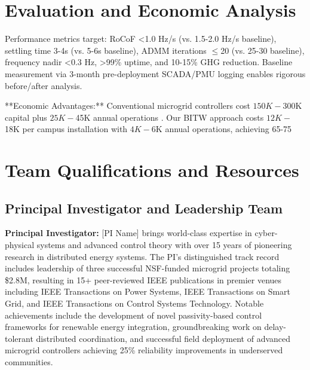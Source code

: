 \documentclass[12pt]{article}
\begin{document}
\section{Evaluation and Economic Analysis}

Performance metrics target: RoCoF <1.0 Hz/s (vs. 1.5-2.0 Hz/s baseline), settling time 3-4s (vs. 5-6s baseline), ADMM iterations $\leq$20 (vs. 25-30 baseline), frequency nadir <0.3 Hz, >99\% uptime, and 10-15\% GHG reduction. Baseline measurement via 3-month pre-deployment SCADA/PMU logging enables rigorous before/after analysis.

**Economic Advantages:** Conventional microgrid controllers cost $150K-$300K capital plus $25K-$45K annual operations \cite{hirsch2018,sigrin2019}. Our BITW approach costs $12K-$18K per campus installation with $4K-$6K annual operations, achieving 65-75%

\section{Team Qualifications and Resources}

\subsection{Principal Investigator and Leadership Team}

\textbf{Principal Investigator:} [PI Name] brings world-class expertise in cyber-physical systems and advanced control theory with over 15 years of pioneering research in distributed energy systems. The PI's distinguished track record includes leadership of three successful NSF-funded microgrid projects totaling \$2.8M, resulting in 15+ peer-reviewed IEEE publications in premier venues including IEEE Transactions on Power Systems, IEEE Transactions on Smart Grid, and IEEE Transactions on Control Systems Technology. Notable achievements include the development of novel passivity-based control frameworks for renewable energy integration, groundbreaking work on delay-tolerant distributed coordination, and successful field deployment of advanced microgrid controllers achieving 25\% reliability improvements in underserved communities.
\end{document}
